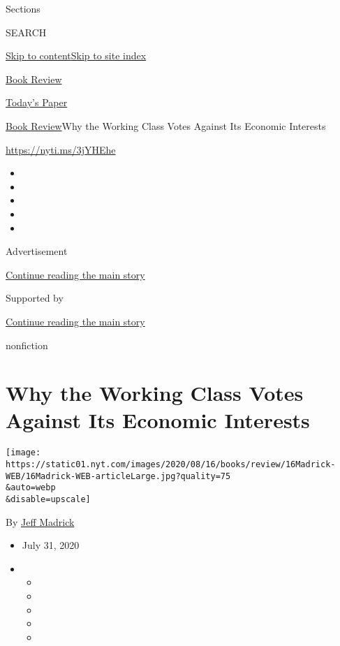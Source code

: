 Sections

SEARCH

\protect\hyperlink{site-content}{Skip to
content}\protect\hyperlink{site-index}{Skip to site index}

\href{https://www.nytimes.com/section/books/review}{Book Review}

\href{https://myaccount.nytimes.com/auth/login?response_type=cookie\&client_id=vi}{}

\href{https://www.nytimes.com/section/todayspaper}{Today's Paper}

\href{/section/books/review}{Book Review}\textbar{}Why the Working Class
Votes Against Its Economic Interests

\url{https://nyti.ms/3jYHEhe}

\begin{itemize}
\item
\item
\item
\item
\item
\end{itemize}

Advertisement

\protect\hyperlink{after-top}{Continue reading the main story}

Supported by

\protect\hyperlink{after-sponsor}{Continue reading the main story}

nonfiction

\hypertarget{why-the-working-class-votes-against-its-economic-interests}{%
\section{Why the Working Class Votes Against Its Economic
Interests}\label{why-the-working-class-votes-against-its-economic-interests}}

\texttt{[image: https://static01.nyt.com/images/2020/08/16/books/review/16Madrick-WEB/16Madrick-WEB-articleLarge.jpg?quality=75\\\&auto=webp\\\&disable=upscale]}

By \href{https://www.nytimes.com/by/jeff-madrick}{Jeff Madrick}

\begin{itemize}
\item
  July 31, 2020
\item
  \begin{itemize}
  \item
  \item
  \item
  \item
  \item
  \end{itemize}
\end{itemize}

